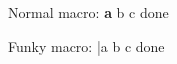 \documentclass{article}
\def\foo#1{\textbf{#1}}
\def\bar#1#{\textbf{#1}}
\begin{document}
Normal macro: \foo a b c {done}

Funky macro: \bar a b c {done}
\end{document}
